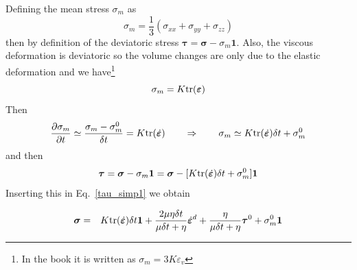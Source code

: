 Defining the mean stress $\sigma_m$ as
\[
\sigma_m = \frac13(\sigma_{xx}+\sigma_{yy}+\sigma_{zz})
\]
then by definition of the deviatoric stress 
$\bm\tau = \bm\sigma -\sigma_m {\bm 1} $. 
Also, the viscous deformation is deviatoric so the volume changes
are only due to the elastic deformation and we have\footnote{
In the book it is written as $\sigma_m = 3K \varepsilon_v $}
\[
\sigma_m 
= K {\rm tr}({\bm\varepsilon})
\]
Then
\[
\frac{\partial\sigma_m}{\partial t} 
\simeq 
\frac{\sigma_m - \sigma_m^0}{\delta t}
= K {\rm tr}(\dot{\bm\varepsilon})
\qquad
\Rightarrow
\qquad
\sigma_m \simeq K  {\rm tr}(\dot{\bm\varepsilon}) \delta t + \sigma_m^0
\]
and then
\[
\bm\tau = \bm\sigma -\sigma_m {\bm 1} 
= \bm\sigma - [K {\rm tr}(\dot{\bm\varepsilon}) \delta t + \sigma_m^0] {\bm 1}
\]
Inserting this in Eq.~\eqref{tau_simp1}
we obtain 
\begin{mdframed}[backgroundcolor=blue!5]
\begin{eqnarray}
\bm \sigma 
&=& 
K {\rm tr}(\dot{\bm\varepsilon}) \delta t {\bm 1}  +
\frac{2 \mu \eta\delta t}{ \mu\delta t +\eta} \dot{\bm\varepsilon}^d +
\frac{ \eta}{\mu\delta t + \eta}  \bm\tau^0 + \sigma_m^0 {\bm 1}
\end{eqnarray}
\end{mdframed}

